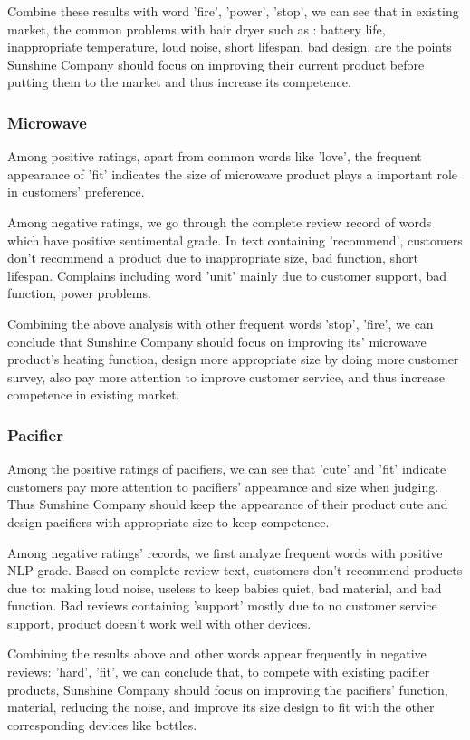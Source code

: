 \documentclass[12pt]{article}
\begin{document}
Combine these results with word 'fire', 'power', 'stop', we can see that in existing market, the common problems with hair dryer such as : battery life, inappropriate temperature, loud noise, short lifespan, bad design, are the points Sunshine Company should focus on improving their current product before putting them to the market and thus increase its competence. 

\subsubsection{Microwave}
Among positive ratings, apart from common words like 'love', the frequent appearance of 'fit' indicates the size of microwave product plays a important role in customers' preference.

Among negative ratings, we go through the complete review record of words which have positive sentimental grade. In text containing 'recommend', customers don't recommend a product due to inappropriate size, bad function, short lifespan. Complains including word 'unit' mainly due to customer support, bad function, power problems.

Combining the above analysis with other frequent words 'stop', 'fire', we can conclude that Sunshine Company should focus on improving its' microwave product's heating function, design more appropriate size by doing more customer survey, also pay more attention to improve customer service, and thus increase competence in existing market.

\subsubsection{Pacifier}
Among the positive ratings of pacifiers, we can see that 'cute' and 'fit' indicate customers pay more attention to pacifiers' appearance and size when judging. Thus Sunshine Company should keep the appearance of their product cute and design pacifiers with appropriate size to keep competence. 

Among negative ratings' records, we first analyze frequent words with positive NLP grade. Based on complete review text, customers don't recommend products due to: making loud noise, useless to keep babies quiet, bad material, and bad function. Bad reviews containing 'support' mostly due to no customer service support, product doesn't work well with other devices.

Combining the results above and other words appear frequently in negative reviews: 'hard', 'fit', we can conclude that, to compete with existing pacifier products, Sunshine Company should focus on improving the pacifiers' function, material, reducing the noise, and improve its size design to fit with the other corresponding devices like bottles. 
\end{document}
